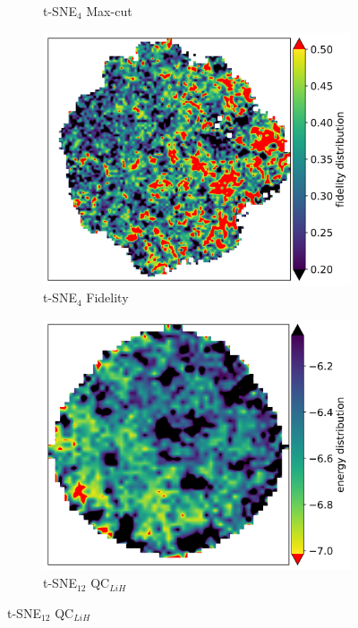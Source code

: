 \documentclass{article} %
\begin{document}
\begin{figure}[ht]
\begin{subfigure}{0.23\textwidth}
        \caption{t-SNE$_4$ Max-cut}
        \label{fig:t-SNE4 Maxcut}
    \end{subfigure}
    \begin{subfigure}{0.23\textwidth}
        \centering
        \includegraphics[width=\textwidth]{images/tsqe/fidelity-model-circuits_4_qubits_quantum_arch2vec_full_embedding_full_embedding_smooth.png}
        \caption{t-SNE$_4$ Fidelity}
        \label{fig:t-SNE4 Prev}
    \end{subfigure}
    \begin{subfigure}{0.23\textwidth}
        \centering
        \includegraphics[width=\textwidth]{images/tsqe/vqe-model-circuits_12_qubits_quantum_arch2vec_full_embedding_full_embedding_smooth.png}
        \caption{t-SNE$_{12}$ QC$_{LiH}$}
        \label{fig:t-SNE-12}
    \end{subfigure}


\end{figure}
\end{document}
